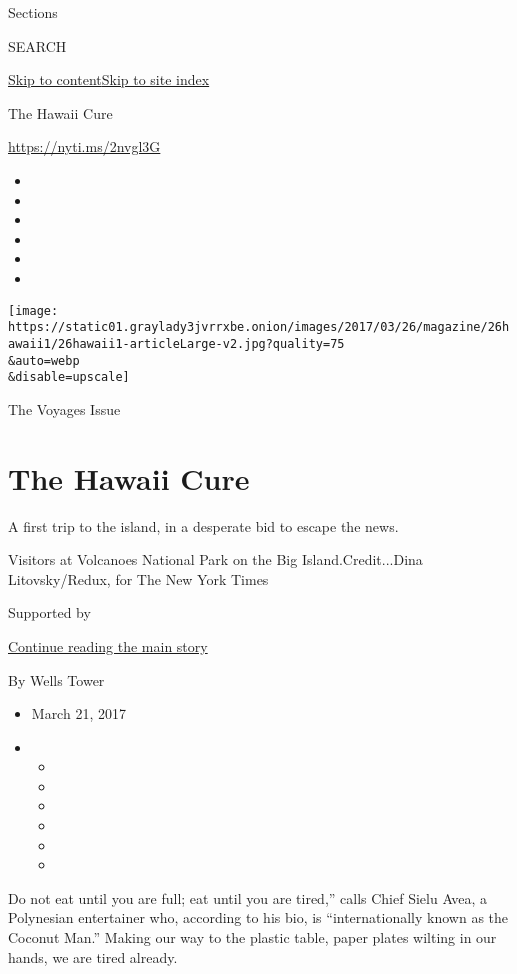 Sections

SEARCH

\protect\hyperlink{site-content}{Skip to
content}\protect\hyperlink{site-index}{Skip to site index}

The Hawaii Cure

\url{https://nyti.ms/2nvgl3G}

\begin{itemize}
\item
\item
\item
\item
\item
\item
\end{itemize}

\texttt{[image: https://static01.graylady3jvrrxbe.onion/images/2017/03/26/magazine/26hawaii1/26hawaii1-articleLarge-v2.jpg?quality=75\\\&auto=webp\\\&disable=upscale]}

The Voyages Issue

\hypertarget{the-hawaii-cure}{%
\section{The Hawaii Cure}\label{the-hawaii-cure}}

A first trip to the island, in a desperate bid to escape the news.

Visitors at Volcanoes National Park on the Big Island.Credit...Dina
Litovsky/Redux, for The New York Times

Supported by

\protect\hyperlink{after-sponsor}{Continue reading the main story}

By Wells Tower

\begin{itemize}
\item
  March 21, 2017
\item
  \begin{itemize}
  \item
  \item
  \item
  \item
  \item
  \item
  \end{itemize}
\end{itemize}

Do not eat until you are full; eat until you are tired,'' calls Chief
Sielu Avea, a Polynesian entertainer who, according to his bio, is
``internationally known as the Coconut Man.'' Making our way to the
plastic table, paper plates wilting in our hands, we are tired already.

